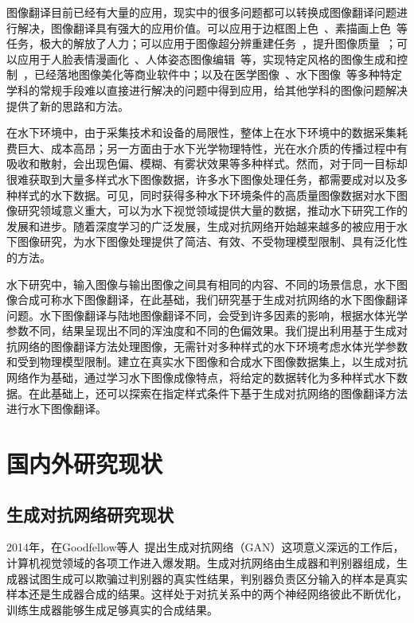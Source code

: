 图像翻译目前已经有大量的应用，现实中的很多问题都可以转换成图像翻译问题进行解决，图像翻译具有强大的应用价值。可以应用于边框图上色~\cite{ghosh2019interactive}、素描画上色~\cite{cao2017unsupervised,nazeri2018image}等任务，极大的解放了人力；可以应用于图像超分辨重建任务~\cite{ledig2017photo,zhang2019ranksrgan,anokhin2020high}，提升图像质量~\cite{wang2019discriminative,bowles2018gan}；可以应用于人脸表情漫画化~\cite{yi2019apdrawinggan,shi2019warpgan}、人体姿态图像编辑~\cite{chan2019everybody,cao2019improving}等，实现特定风格的图像生成和控制~\cite{karras2019style}，已经落地图像美化等商业软件中；以及在医学图像~\cite{zhou2019prior,lee2019collagan}、水下图像~\cite{uplavikar2019all,li2020underwater}等多种特定学科的常规手段难以直接进行解决的问题中得到应用，给其他学科的图像问题解决提供了新的思路和方法。

在水下环境中，由于采集技术和设备的局限性，整体上在水下环境中的数据采集耗费巨大、成本高昂；另一方面由于水下光学物理特性，光在水介质的传播过程中有吸收和散射，会出现色偏、模糊、有雾状效果等多种样式。然而，对于同一目标却很难获取到大量多样式水下图像数据，许多水下图像处理任务，都需要成对以及多种样式的水下数据。可见，同时获得多种水下环境条件的高质量图像数据对水下图像研究领域意义重大，可以为水下视觉领域提供大量的数据，推动水下研究工作的发展和进步。随着深度学习的广泛发展，生成对抗网络开始越来越多的被应用于水下图像研究，为水下图像处理提供了简洁、有效、不受物理模型限制、具有泛化性的方法。

水下研究中，输入图像与输出图像之间具有相同的内容、不同的场景信息，水下图像合成可称水下图像翻译，在此基础，我们研究基于生成对抗网络的水下图像翻译问题。水下图像翻译与陆地图像翻译不同，会受到许多因素的影响，根据水体光学参数不同，结果呈现出不同的浑浊度和不同的色偏效果。我们提出利用基于生成对抗网络的图像翻译方法处理图像，无需针对多种样式的水下环境考虑水体光学参数和受到物理模型限制。建立在真实水下图像和合成水下图像数据集上，以生成对抗网络作为基础，通过学习水下图像成像特点，将给定的数据转化为多种样式水下数据。在此基础上，还可以探索在指定样式条件下基于生成对抗网络的图像翻译方法进行水下图像翻译。

\section{国内外研究现状}
\subsection{生成对抗网络研究现状}
2014年，在Goodfellow等人~\cite{goodfellow2014generative}提出生成对抗网络（GAN）这项意义深远的工作后，计算机视觉领域的各项工作进入爆发期。生成对抗网络由生成器和判别器组成，生成器试图生成可以欺骗过判别器的真实性结果，判别器负责区分输入的样本是真实样本还是生成器合成的结果。这样处于对抗关系中的两个神经网络彼此不断优化，训练生成器能够生成足够真实的合成结果。

